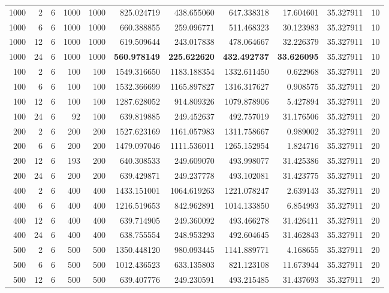 \begin{table}
\begin{tabular}{rrrrrrrrrrr}
1000 & 2 & 6 & 1000 & 1000 & 825.024719 & 438.655060 & 647.338318 & 17.604601 & 35.327911 & 10 \\
1000 & 6 & 6 & 1000 & 1000 & 660.388855 & 259.096771 & 511.468323 & 30.123983 & 35.327911 & 10 \\
1000 & 12 & 6 & 1000 & 1000 & 619.509644 & 243.017838 & 478.064667 & 32.226379 & 35.327911 & 10 \\
1000 & 24 & 6 & 1000 & 1000 & \textbf{560.978149} & \textbf{225.622620} & \textbf{432.492737} & \textbf{33.626095} & 35.327911 & 10 \\
100 & 2 & 6 & 100 & 100 & 1549.316650 & 1183.188354 & 1332.611450 & 0.622968 & 35.327911 & 20 \\
100 & 6 & 6 & 100 & 100 & 1532.366699 & 1165.897827 & 1316.317627 & 0.908575 & 35.327911 & 20 \\
100 & 12 & 6 & 100 & 100 & 1287.628052 & 914.809326 & 1079.878906 & 5.427894 & 35.327911 & 20 \\
100 & 24 & 6 & 92 & 100 & 639.819885 & 249.452637 & 492.757019 & 31.176506 & 35.327911 & 20 \\
200 & 2 & 6 & 200 & 200 & 1527.623169 & 1161.057983 & 1311.758667 & 0.989002 & 35.327911 & 20 \\
200 & 6 & 6 & 200 & 200 & 1479.097046 & 1111.536011 & 1265.152954 & 1.824716 & 35.327911 & 20 \\
200 & 12 & 6 & 193 & 200 & 640.308533 & 249.609070 & 493.998077 & 31.425386 & 35.327911 & 20 \\
200 & 24 & 6 & 200 & 200 & 639.429871 & 249.237778 & 493.102081 & 31.423775 & 35.327911 & 20 \\
400 & 2 & 6 & 400 & 400 & 1433.151001 & 1064.619263 & 1221.078247 & 2.639143 & 35.327911 & 20 \\
400 & 6 & 6 & 400 & 400 & 1216.519653 & 842.962891 & 1014.133850 & 6.854993 & 35.327911 & 20 \\
400 & 12 & 6 & 400 & 400 & 639.714905 & 249.360092 & 493.466278 & 31.426411 & 35.327911 & 20 \\
400 & 24 & 6 & 400 & 400 & 638.755554 & 248.953293 & 492.604645 & 31.462843 & 35.327911 & 20 \\
500 & 2 & 6 & 500 & 500 & 1350.448120 & 980.093445 & 1141.889771 & 4.168655 & 35.327911 & 20 \\
500 & 6 & 6 & 500 & 500 & 1012.436523 & 633.135803 & 821.123108 & 11.673944 & 35.327911 & 20 \\
500 & 12 & 6 & 500 & 500 & 639.407776 & 249.230591 & 493.215485 & 31.437693 & 35.327911 & 20 \\

\end{tabular}
\end{table}
